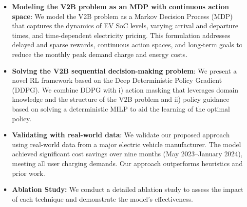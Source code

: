 


\begin{itemize}[leftmargin=*]
\item \textbf{Modeling the V2B problem as an MDP with continuous action space}: We model the V2B problem as a Markov Decision Process (MDP) that captures the dynamics of EV SoC levels, varying arrival and departure times, and time-dependent electricity pricing. This formulation addresses delayed and sparse rewards, continuous action spaces, and long-term goals to reduce the monthly peak demand charge and energy costs. 
\item \textbf{Solving the V2B sequential decision-making problem}: We present a novel RL framework based on the Deep Deterministic Policy Gradient (DDPG). We combine DDPG with i) action masking that leverages domain knowledge and the structure of the V2B problem and ii) policy guidance based on solving a deterministic MILP to aid the learning of the optimal policy.

\item \textbf{Validating with real-world data}: We validate our proposed approach using real-world data from a major electric vehicle manufacturer. The model achieved significant cost savings
over nine months (May 2023–January 2024), meeting all user charging demands. Our approach outperforms heuristics and prior work.
\item \textbf{Ablation Study:} We conduct a detailed ablation study to assess the impact of each technique and demonstrate the model's effectiveness.



\end{itemize}
